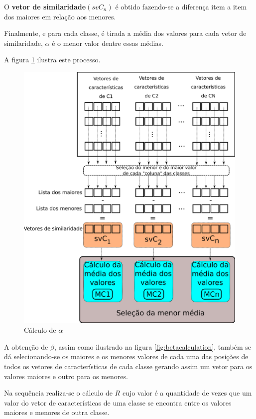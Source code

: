 				\par O \textbf{vetor de similaridade}$(svC_n)$ é obtido fazendo-se a diferença item a item dos maiores em relação aos menores.
				
				\par Finalmente, e para cada classe, é tirada a média dos valores para cada vetor de similaridade, $\alpha$ é o menor valor dentre essas médias.
				
				\par A figura \ref{fig:calculoalpha} ilustra este processo.
				
				\begin{figure}[h]
					\centering
					\includegraphics[width=0.7\linewidth]{images/calculoAlpha.pdf}
					\caption{Cálculo de $\alpha$}
					\label{fig:calculoalpha}
				\end{figure}
				
				\par A obtenção de $\beta$, assim como ilustrado na figura \ref{fig:betacalculation}, também se dá selecionando-se os maiores e os menores valores de cada uma das posições de todos os vetores de características de cada classe gerando assim um vetor para os valores maiores e outro para os menores.
				
				\par Na sequência realiza-se o cálculo de $R$ cujo valor é a quantidade de vezes que um valor do vetor de características de uma classe se encontra entre os valores maiores e menores de outra classe.
				
